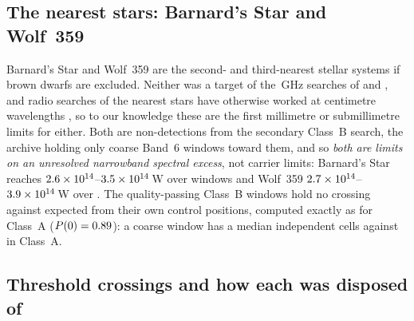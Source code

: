 \subsection{The nearest stars: Barnard's Star and Wolf~359}
\label{sec:barnardswolf}

Barnard's Star and Wolf~359 are the second- and third-nearest stellar systems
if brown dwarfs are excluded. Neither was a target of the \SbPriorFreqGHz\,GHz searches
of \citet{Steffes1994} and \citet{Mauersberger1996}, and radio searches of the
nearest stars have otherwise worked at centimetre wavelengths
\citep{Enriquez2017,Price2020,Margot2023}, so to our knowledge these are the
first millimetre or submillimetre limits for either. Both are non-detections
from the secondary Class~B search, the archive holding only coarse Band~6
windows toward them, and so \emph{both are limits on an unresolved narrowband
spectral excess}, not carrier limits: Barnard's Star reaches
$2.6\times10^{14}$--$3.5\times10^{14}$\,W over \NWinBarn{} windows and
Wolf~359 $2.7\times10^{14}$--$3.9\times10^{14}$\,W over \NWinWolf.
The \CeNWinBClean{} quality-passing Class~B windows hold no crossing against
\CeExpB{} expected from their own control positions, computed exactly as for
Class~A ($P(0)=0.89$): a coarse window has a median \CeIndCellsMedB{}
independent cells against \CeIndCellsMedA{} in Class~A.

\subsection{Threshold crossings and how each was disposed of}
\label{sec:technosearch}

